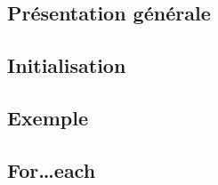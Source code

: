 \subsection{Présentation générale}\label{subsec:presentation-generale}
\subsection{Initialisation}\label{subsec:initialisation}
\subsection{Exemple}\label{subsec:exemple}
\subsection{For\ldots each}\label{subsec:for-each}